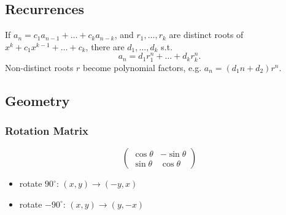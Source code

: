 \subsection{Recurrences}
If $a_n = c_1 a_{n-1} + \dots + c_k a_{n-k}$, and $r_1, \dots, r_k$ are distinct roots of $x^k + c_1 x^{k-1} + \dots + c_k$, there are $d_1, \dots, d_k$ s.t.
\[a_n = d_1r_1^n + \dots + d_kr_k^n. \]
Non-distinct roots $r$ become polynomial factors, e.g. $a_n = (d_1n + d_2)r^n$.

\subsection{Geometry}

\subsubsection{Rotation Matrix}

\[ \begin{pmatrix}
    \cos \theta & -\sin \theta \\
    \sin \theta & \cos \theta
\end{pmatrix} \]

\begin{itemize}
    \item rotate $90^\circ$: $(x,y) \to (-y, x)$
    \item rotate $-90^\circ$: $(x,y) \to (y, -x)$
\end{itemize}


